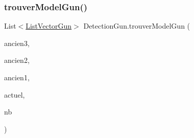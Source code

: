 \subsubsection{\texorpdfstring{trouver\+Model\+Gun()}{trouverModelGun()}}
{\footnotesize\ttfamily List$<$\mbox{\hyperlink{class_list_vector_gun}{List\+Vector\+Gun}}$>$ Detection\+Gun.\+trouver\+Model\+Gun (\begin{DoxyParamCaption}\item[{List$<$ \mbox{\hyperlink{class_list_vector_gun}{List\+Vector\+Gun}} $>$}]{ancien3,  }\item[{List$<$ \mbox{\hyperlink{class_list_vector_gun}{List\+Vector\+Gun}} $>$}]{ancien2,  }\item[{List$<$ \mbox{\hyperlink{class_list_vector_gun}{List\+Vector\+Gun}} $>$}]{ancien1,  }\item[{List$<$ \mbox{\hyperlink{class_list_vector_gun}{List\+Vector\+Gun}} $>$}]{actuel,  }\item[{int}]{nb }\end{DoxyParamCaption})\hspace{0.3cm}{\ttfamily [inline]}}






